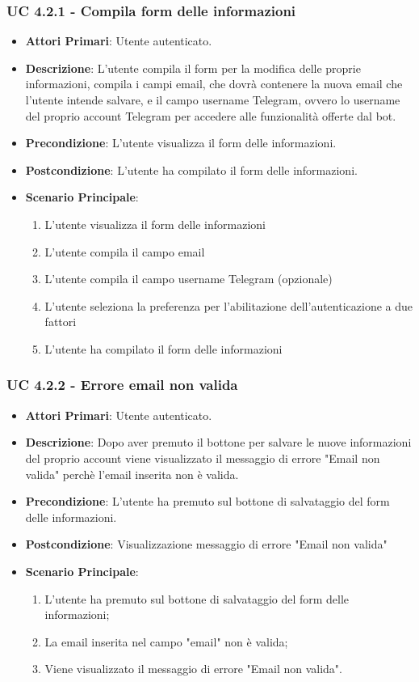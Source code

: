 			\subsubsection{UC 4.2.1 - Compila form delle informazioni}
			\begin{itemize}
				\item \textbf{Attori Primari}: Utente autenticato.
				\item \textbf{Descrizione}: L'utente compila il form per la modifica delle proprie informazioni, compila i campi email, che dovrà contenere la nuova email che l'utente intende salvare, e il campo username Telegram, ovvero lo username del proprio account Telegram per accedere alle funzionalità offerte dal bot.
				\item \textbf{Precondizione}: L'utente visualizza il form delle informazioni.
				\item \textbf{Postcondizione}: L'utente ha compilato il form delle informazioni.
				\item \textbf{Scenario Principale}:
				\begin{enumerate}
					\item{L'utente visualizza il form delle informazioni}
					\item{L'utente compila il campo email}
					\item{L'utente compila il campo username Telegram (opzionale)}
					\item{L'utente seleziona la preferenza per l'abilitazione dell'autenticazione a due fattori}
					\item{L'utente ha compilato il form delle informazioni}
				\end{enumerate}
			\end{itemize}

			\subsubsection{UC 4.2.2 - Errore email non valida}
			\begin{itemize}
				\item \textbf{Attori Primari}: Utente autenticato.
				\item \textbf{Descrizione}: Dopo aver premuto il bottone per salvare le nuove informazioni del proprio account viene visualizzato il messaggio di errore "Email non valida" perchè l'email inserita non è valida. 
				\item \textbf{Precondizione}: L'utente ha premuto sul bottone di salvataggio del form delle informazioni.
				\item \textbf{Postcondizione}: Visualizzazione messaggio di errore "Email non valida"
				\item \textbf{Scenario Principale}:
				\begin{enumerate}
					\item{L'utente ha premuto sul bottone di salvataggio del form delle informazioni;}
					\item{La email inserita nel campo "email" non è valida;}
					\item{Viene visualizzato il messaggio di errore "Email non valida".}
				\end{enumerate}	
			\end{itemize}

